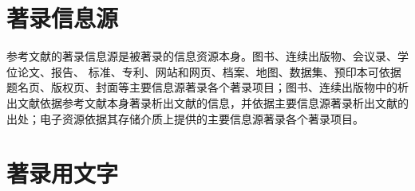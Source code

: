 \documentclass[twoside]{article}%
\begin{document}
\section{著录信息源}

参考文献的著录信息源是被著录的信息资源本身。图书、连续出版物、会议录、学位论文、报告、
标准、专利、网站和网页、档案、地图、数据集、预印本可依据题名页、版权页、封面等主要信息源著录各个著录项目；图书、连续出版物中的析出文献依据参考文献本身著录析出文献的信息，并依据主要信息源著录析出文献的出处；电子资源依据其存储介质上提供的主要信息源著录各个著录项目。

\section{著录用文字}
\end{document}

